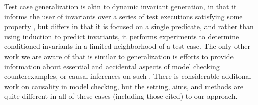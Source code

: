 Test case generalization is akin to dynamic invariant
generation, in that it informs the user of invariants over a series of
test executions satisfying some property \cite{Daikon}, but differs in
that it is focused on a single predicate, and rather than using
induction to predict invariants, it performs experiments to determine
conditioned invariants in a limited neighborhood of a test case.
The only other work we are aware of that is similar to generalization
is efforts to provide information about essential and accidental
aspects of model checking counterexamples, or causal inferences on
such \cite{FreeWill,MakeMost,SPIN03}.  There is considerable
additonal work on causality in model checking, but the setting, aims,
and methods are quite different in all of these cases (including those
cited) to our approach.